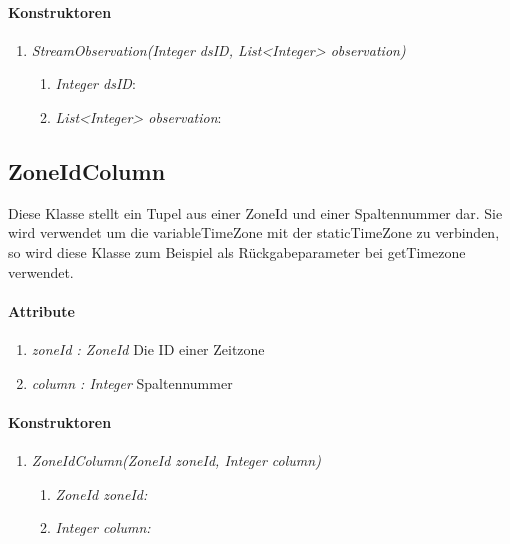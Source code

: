 \paragraph{Konstruktoren}
\begin{enumerate}[+]
	\item \textit{StreamObservation(Integer dsID, List<Integer> observation)} \\
	
	\begin{enumerate}[$\bullet$]
		\item \textit{Integer dsID}:
		\item \textit{List<Integer> observation}:
	\end{enumerate}
\end{enumerate}






\subsection{ZoneIdColumn}
Diese Klasse stellt ein Tupel aus einer ZoneId und einer Spaltennummer dar.
Sie wird verwendet um die variableTimeZone mit der staticTimeZone zu verbinden, so wird diese Klasse zum Beispiel als Rückgabeparameter bei getTimezone verwendet.

\paragraph{Attribute}
\begin{enumerate}[-]
	\item \textit{zoneId : ZoneId} Die ID einer Zeitzone
	\item \textit{column : Integer} Spaltennummer
\end{enumerate}

\paragraph{Konstruktoren}
\begin{enumerate}[+]
	\item \textit{ZoneIdColumn(ZoneId zoneId, Integer column)} \\
	
	\begin{enumerate}[$\bullet$]
		\item \textit{ZoneId zoneId:} 
		\item \textit{Integer column:} 
	\end{enumerate}
\end{enumerate}












